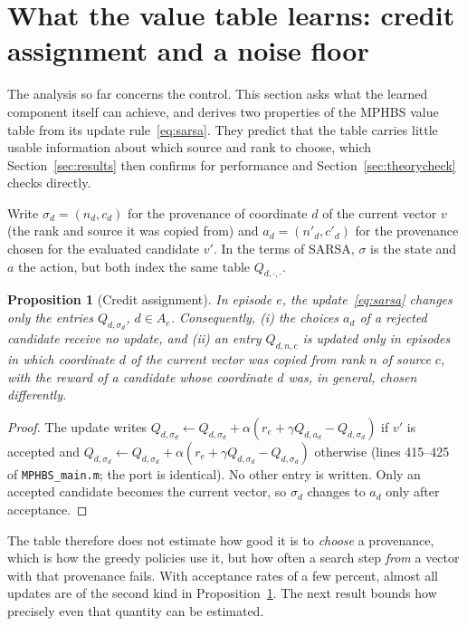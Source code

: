 \documentclass[11pt]{article}
\newtheorem{proposition}{Proposition}
\theoremstyle{definition}
\theoremstyle{remark}
\begin{document}
\section{What the value table learns: credit assignment and a noise floor}
\label{sec:theory}

The analysis so far concerns the control. This section asks what the learned component itself can achieve, and derives
two properties of the MPHBS value table from its update rule~\eqref{eq:sarsa}. They predict that the table carries
little usable information about which source and rank to choose, which Section~\ref{sec:results} then confirms for
performance and Section~\ref{sec:theorycheck} checks directly.

Write $\sigma_d=(n_d,c_d)$ for the provenance of coordinate $d$ of the current vector $v$ (the rank and source it was
copied from) and $a_d=(n'_d,c'_d)$ for the provenance chosen for the evaluated candidate $v'$. In the terms of SARSA,
$\sigma$ is the state and $a$ the action, but both index the same table $Q_{d,\cdot,\cdot}$.

\begin{proposition}[Credit assignment]
\label{prop:credit}
In episode $e$, the update~\eqref{eq:sarsa} changes only the entries $Q_{d,\sigma_d}$, $d\in A_e$. Consequently,
(i) the choices $a_d$ of a rejected candidate receive no update, and (ii) an entry $Q_{d,n,c}$ is updated only in
episodes in which coordinate $d$ of the current vector was copied from rank $n$ of source $c$, with the reward of a
candidate whose coordinate $d$ was, in general, chosen differently.
\end{proposition}
\begin{proof}
The update writes $Q_{d,\sigma_d}\gets Q_{d,\sigma_d}+\alpha(r_e+\gamma Q_{d,a_d}-Q_{d,\sigma_d})$ if $v'$ is accepted
and $Q_{d,\sigma_d}\gets Q_{d,\sigma_d}+\alpha(r_e+\gamma Q_{d,\sigma_d}-Q_{d,\sigma_d})$ otherwise (lines 415--425 of
\texttt{MPHBS\_main.m}; the port is identical). No other entry is written. Only an accepted candidate becomes the current
vector, so $\sigma_d$ changes to $a_d$ only after acceptance.
\end{proof}

The table therefore does not estimate how good it is to \emph{choose} a provenance, which is how the greedy policies use
it, but how often a search step \emph{from} a vector with that provenance fails. With acceptance rates of a few percent,
almost all updates are of the second kind in Proposition~\ref{prop:credit}. The next result bounds how precisely even
that quantity can be estimated.
\end{document}
